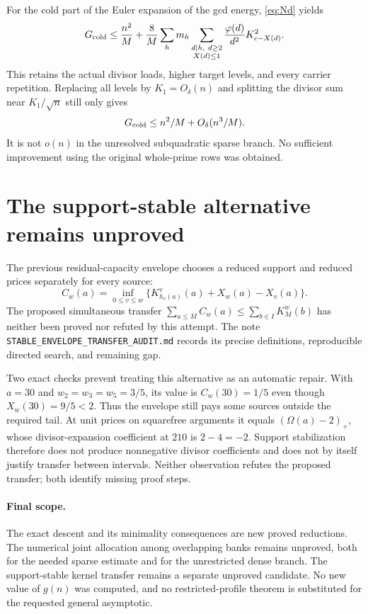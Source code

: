 \documentclass[a4paper,11pt]{article}
\begin{document}
For the cold part of the Euler expansion of the gcd energy, \eqref{eq:Nd} yields
\[
 G_{\rm cold}\le\frac{n^2}{M}
 +\frac8M\sum_hm_h
 \sum_{\substack{d\mid h,\ d\ge2\\X(d)\le1}}
 \frac{\varphi(d)}{d^2}K_{c-X(d)}^2.
\]
This retains the actual divisor loads, higher target levels, and every carrier repetition. Replacing all levels by $K_1=O_\delta(n)$ and splitting the divisor sum near $K_1/\sqrt n$ still only gives
\[
 G_{\rm cold}\le n^2/M+O_\delta(n^3/M).
\]
It is not $o(n)$ in the unresolved subquadratic sparse branch. No sufficient improvement using the original whole-prime rows was obtained.

\section{The support-stable alternative remains unproved}
The previous residual-capacity envelope chooses a reduced support and reduced prices separately for every source:
\[
 C_w(a)=\inf_{0\le v\le w}
 \{K^v_{h_v(a)}(a)+X_w(a)-X_v(a)\}.
\]
The proposed simultaneous transfer $\sum_{a\le M}C_w(a)\le\sum_{b\in I}K_M^w(b)$ has neither been proved nor refuted by this attempt. The note \texttt{STABLE\_ENVELOPE\_TRANSFER\_AUDIT.md} records its precise definitions, reproducible directed search, and remaining gap.

Two exact checks prevent treating this alternative as an automatic repair. With $a=30$ and $w_2=w_3=w_5=3/5$, its value is $C_w(30)=1/5$ even though $X_w(30)=9/5<2$. Thus the envelope still pays some sources outside the required tail. At unit prices on squarefree arguments it equals $(\Omega(a)-2)_+$, whose divisor-expansion coefficient at $210$ is $2-4=-2$. Support stabilization therefore does not produce nonnegative divisor coefficients and does not by itself justify transfer between intervals. Neither observation refutes the proposed transfer; both identify missing proof steps.

\paragraph{Final scope.} The exact descent and its minimality consequences are new proved reductions. The numerical joint allocation among overlapping banks remains unproved, both for the needed sparse estimate and for the unrestricted dense branch. The support-stable kernel transfer remains a separate unproved candidate. No new value of $g(n)$ was computed, and no restricted-profile theorem is substituted for the requested general asymptotic.
\end{document}
